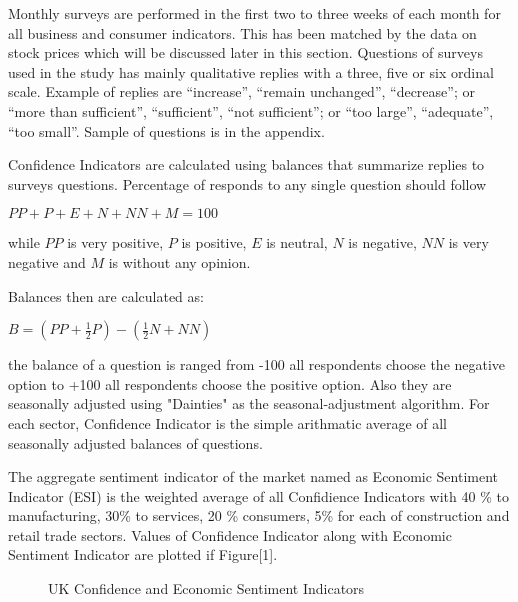 \documentclass[12pt]{article}																																															%
\begin{document}
\par  Monthly surveys are performed in the first two to three weeks of each month for all business and consumer indicators. This has been matched by the data on stock prices which will be discussed later in this section. Questions of surveys used in the study has mainly qualitative replies with a three, five or six ordinal scale. Example of replies are “increase”, “remain unchanged”, “decrease”; or “more than sufficient”, “sufficient”, “not sufficient”; or “too large”, “adequate”, “too small”. Sample of questions is in the appendix.
\par Confidence Indicators are calculated using balances that summarize replies to surveys questions. Percentage of responds to any single question should follow
{\par \centering $PP+P+E+N+NN+M=100$\\}
\vspace{0.2 cm}
\par while $PP$ is very positive, $P$ is positive, $E$ is neutral, $N$ is negative, $NN$ is very negative and $M$ is without any opinion.

\par Balances then are calculated as:
\vspace{0.5 cm}
{\par \centering $B = (PP + \frac{1}{2}P) - (\frac{1}{2}N + NN)$\\}
\vspace{0.5 cm}
the balance of a question is ranged from -100 all respondents choose the negative option to +100 all respondents choose the positive option. Also they are seasonally adjusted using "Dainties" as the seasonal-adjustment algorithm. For each sector, Confidence Indicator is the simple arithmatic average of all seasonally adjusted balances of questions.

\par The aggregate sentiment indicator of the market named as Economic Sentiment Indicator (ESI) is the weighted average of all Confidience Indicators with 40 \% to manufacturing, 30\% to services, 20 \% consumers, 5\% for each of construction and retail trade sectors. Values of Confidence Indicator along with Economic Sentiment Indicator are plotted if Figure[1].

\begin{figure}[!htb]
{\centering
\caption{UK Confidence and Economic Sentiment Indicators}
}
\end{figure}
\end{document}
